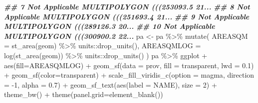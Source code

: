 \documentclass[10pt,landscape,a3paper]{article}
\newenvironment{Shaded}{\begin{snugshade}}{\end{snugshade}}
\newcommand{\AttributeTok}[1]{\textcolor[rgb]{0.77,0.63,0.00}{#1}}
\newcommand{\DecValTok}[1]{\textcolor[rgb]{0.00,0.00,0.81}{#1}}
\newcommand{\DocumentationTok}[1]{\textcolor[rgb]{0.56,0.35,0.01}{\textbf{\textit{#1}}}}
\newcommand{\FloatTok}[1]{\textcolor[rgb]{0.00,0.00,0.81}{#1}}
\newcommand{\FunctionTok}[1]{\textcolor[rgb]{0.00,0.00,0.00}{#1}}
\newcommand{\NormalTok}[1]{#1}
\newcommand{\OtherTok}[1]{\textcolor[rgb]{0.56,0.35,0.01}{#1}}
\newcommand{\SpecialCharTok}[1]{\textcolor[rgb]{0.00,0.00,0.00}{#1}}
\newcommand{\StringTok}[1]{\textcolor[rgb]{0.31,0.60,0.02}{#1}}
\begin{document}
\begin{Shaded}
\begin{Highlighting}[]
\DocumentationTok{\#\# 7  Not Applicable MULTIPOLYGON (((253093.5 21...}
\DocumentationTok{\#\# 8  Not Applicable MULTIPOLYGON (((251693.4 21...}
\DocumentationTok{\#\# 9  Not Applicable MULTIPOLYGON (((289126.3 20...}
\DocumentationTok{\#\# 10 Not Applicable MULTIPOLYGON (((300900.2 22...}
\NormalTok{pa }\OtherTok{\textless{}{-}}\NormalTok{ pa }\SpecialCharTok{\%\textgreater{}\%} \FunctionTok{mutate}\NormalTok{(}
  \AttributeTok{AREASQM =} \FunctionTok{st\_area}\NormalTok{(geom) }\SpecialCharTok{\%\textgreater{}\%}\NormalTok{ units}\SpecialCharTok{::}\FunctionTok{drop\_units}\NormalTok{(),}
  \AttributeTok{AREASQMLOG =} \FunctionTok{log}\NormalTok{(}\FunctionTok{st\_area}\NormalTok{(geom)) }\SpecialCharTok{\%\textgreater{}\%}\NormalTok{ units}\SpecialCharTok{::}\FunctionTok{drop\_units}\NormalTok{()}
\NormalTok{)}
\NormalTok{pa }\SpecialCharTok{\%\textgreater{}\%}\NormalTok{ ggplot }\SpecialCharTok{+} \FunctionTok{aes}\NormalTok{(}\AttributeTok{fill=}\NormalTok{AREASQMLOG) }\SpecialCharTok{+}
  \FunctionTok{geom\_sf}\NormalTok{(}\AttributeTok{data =}\NormalTok{ prov, }\AttributeTok{fill =} \StringTok{\textquotesingle{}transparent\textquotesingle{}}\NormalTok{, }\AttributeTok{lwd =} \FloatTok{0.1}\NormalTok{) }\SpecialCharTok{+}
  \FunctionTok{geom\_sf}\NormalTok{(}\AttributeTok{color=}\StringTok{\textquotesingle{}transparent\textquotesingle{}}\NormalTok{) }\SpecialCharTok{+}
  \FunctionTok{scale\_fill\_viridis\_c}\NormalTok{(}\AttributeTok{option =} \StringTok{\textquotesingle{}magma\textquotesingle{}}\NormalTok{, }\AttributeTok{direction =} \SpecialCharTok{{-}}\DecValTok{1}\NormalTok{, }\AttributeTok{alpha =} \FloatTok{0.7}\NormalTok{) }\SpecialCharTok{+}
  \FunctionTok{geom\_sf\_text}\NormalTok{(}\FunctionTok{aes}\NormalTok{(}\AttributeTok{label =}\NormalTok{ NAME), }\AttributeTok{size =} \DecValTok{2}\NormalTok{) }\SpecialCharTok{+}
  \FunctionTok{theme\_bw}\NormalTok{() }\SpecialCharTok{+}
  \FunctionTok{theme}\NormalTok{(}\AttributeTok{panel.grid=}\FunctionTok{element\_blank}\NormalTok{())}
\end{Highlighting}
\end{Shaded}
\end{document}
